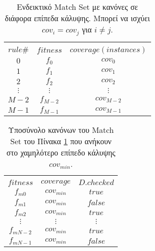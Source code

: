 \begin{table}[!h]
\begin{center}
\caption{Ενδεικτικό Match Set με κανόνες σε διάφορα επίπεδα κάλυψης. Μπορεί να ισχύει $cov_{i}=cov_{j}$ για $i \neq j$.}
\label{table:controlMatchSet0}
    \begin{tabular}{c|cc}
\hline \\ [-1.5ex]
    $rule\#$    & $fitness$ 	& $coverage (instances)$ 	 
\\[1ex] \hline
    $0$     	& $f_{0}$      	& $cov_{0}$  	\\
    $1$    		& $f_{1}$    	& $cov_{1}$   	\\
    $2$     	& $f_{2}$      	& $cov_{2}$   	\\
    $\vdots$    & $\vdots$      & $\vdots$  	\\
    $M-2$       & $f_{M-2}$     & $cov_{M-2}$ 	\\
    $M-1$       & $f_{M-1}$     & $cov_{M-1}$ 	\\                                              
\hline
\end{tabular}
\end{center}
\end{table}





\begin{table}[!h]
\begin{center}
\caption{Υποσύνολο κανόνων του Match Set του Πίνακα \ref{table:controlMatchSet0} που ανήκουν στο χαμηλότερο επίπεδο κάλυψης $cov_{min}$.}
\label{table:controlMatchSet1}
    \begin{tabular}{ccc}
\hline \\ [-1.5ex]
    $fitness$    & $coverage$ 	& $D.checked$ 	 
\\[1ex] \hline
	$f_{m0}$     & $cov_{min}$  & $true$	\\
	$f_{m1}$     & $cov_{min}$  & $false$	\\
	$f_{m2}$     & $cov_{min}$  & $true$	\\
	$\vdots$     & $\vdots$  	& $\vdots$	\\
	$f_{mN-2}$   & $cov_{min}$ 	& $true$	\\
	$f_{mN-1}$   & $cov_{min}$ 	& $false$	\\                                              
\hline
\end{tabular}
\end{center}
\end{table}



